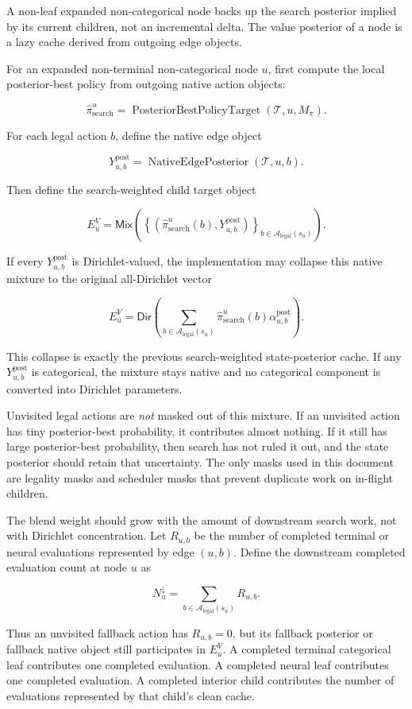 \documentclass[11pt]{article}
\newcommand{\Tree}{\mathcal{T}}
\newcommand{\Legal}{\mathcal{A}_{\mathrm{legal}}}
\newcommand{\PosteriorBestPolicyTarget}{\operatorname{PosteriorBestPolicyTarget}}
\newcommand{\DirObj}{\mathsf{Dir}}
\newcommand{\MixObj}{\mathsf{Mix}}
\newcommand{\NativeEdgePosterior}{\operatorname{NativeEdgePosterior}}
\begin{document}
A non-leaf expanded non-categorical node backs up the search posterior implied
by its current children, not an incremental delta. The value posterior of a node
is a lazy cache derived from outgoing edge objects.

For an expanded non-terminal non-categorical node \(u\), first compute the local
posterior-best policy from outgoing native action objects:

\[
\hat\pi_{\mathrm{search}}^u
=
\PosteriorBestPolicyTarget
\left(
\Tree,u,M_\pi
\right).
\]

For each legal action \(b\), define the native edge object

\[
Y_{u,b}^{\mathrm{post}}
=
\NativeEdgePosterior(\Tree,u,b).
\]

Then define the search-weighted child target object

\[
E^V_u
=
\MixObj
\left(
\left\{
\left(
\hat\pi_{\mathrm{search}}^u(b),
Y_{u,b}^{\mathrm{post}}
\right)
\right\}_{b\in\Legal(s_u)}
\right).
\]

If every \(Y_{u,b}^{\mathrm{post}}\) is Dirichlet-valued, the implementation may
collapse this native mixture to the original all-Dirichlet vector

\[
E^V_u
=
\DirObj\left(
\sum_{b\in\Legal(s_u)}
\hat\pi_{\mathrm{search}}^u(b)
\alpha^{\mathrm{post}}_{u,b}
\right).
\]

This collapse is exactly the previous search-weighted state-posterior cache. If
any \(Y_{u,b}^{\mathrm{post}}\) is categorical, the mixture stays native and no
categorical component is converted into Dirichlet parameters.

Unvisited legal actions are \emph{not} masked out of this mixture. If an
unvisited action has tiny posterior-best probability, it contributes almost
nothing. If it still has large posterior-best probability, then search has not
ruled it out, and the state posterior should retain that uncertainty. The only
masks used in this document are legality masks and scheduler masks that prevent
duplicate work on in-flight children.

The blend weight should grow with the amount of downstream search work, not with
Dirichlet concentration. Let \(R_{u,b}\) be the number of completed terminal or
neural evaluations represented by edge \((u,b)\). Define the downstream completed
evaluation count at node \(u\) as

\[
N^\downarrow_u
=
\sum_{b\in\Legal(s_u)} R_{u,b}.
\]

Thus an unvisited fallback action has \(R_{u,b}=0\), but its fallback posterior
or fallback native object still participates in \(E^V_u\). A completed terminal
categorical leaf contributes one completed evaluation. A completed neural leaf
contributes one completed evaluation. A completed interior child contributes the
number of evaluations represented by that child's clean cache.
\end{document}
